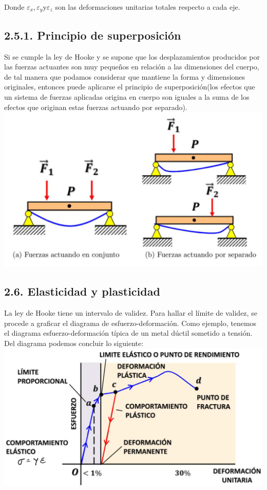 \documentclass[10pt]{article}
\begin{document}
Donde $\varepsilon_{x}, \varepsilon_{y} \mathrm{y} \varepsilon_{z}$ son las deformaciones unitarias totales respecto a cada eje.

\subsection*{2.5.1. Principio de superposición}
Si se cumple la ley de Hooke y se supone que los desplazamientos producidos por las fuerzas actuantes son muy pequeños en relación a las dimensiones del cuerpo, de tal manera que podamos considerar que mantiene la forma y dimensiones originales, entonces puede aplicarse el principio de superposición(los efectos que un sistema de fuerzas aplicadas origina en cuerpo son iguales a la suma de los efectos que originan estas fuerzas actuando por separado).\\
\includegraphics[max width=\textwidth, center]{2025_04_28_a9941da8947ada55c6c9g-07}

\subsection*{2.6. Elasticidad y plasticidad}
La ley de Hooke tiene un intervalo de validez. Para hallar el límite de validez, se procede a graficar el diagrama de esfuerzo-deformación. Como ejemplo, tenemos el diagrama esfuerzo-deformación típica de un metal dúctil sometido a tensión.\\
Del diagrama podemos concluir lo siguiente:\\
\includegraphics[max width=\textwidth, center]{2025_04_28_a9941da8947ada55c6c9g-08}
\end{document}
